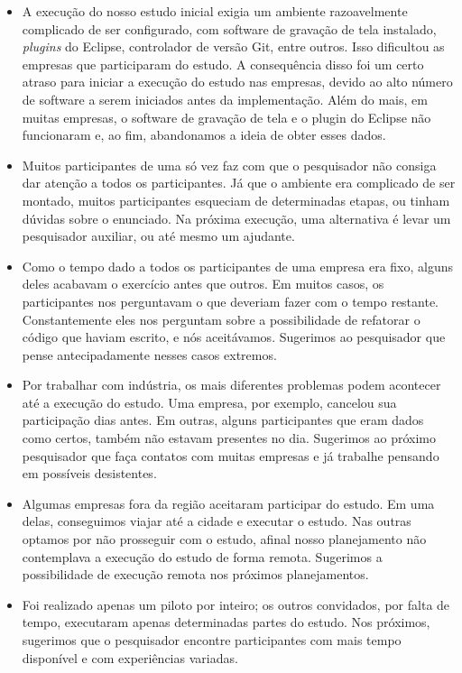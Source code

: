 \begin{itemize}
	
	\item A execução do nosso estudo inicial exigia um ambiente razoavelmente
	complicado de ser configurado, com software de gravação de tela instalado, \textit{plugins} do Eclipse,
	controlador de versão Git, entre outros. Isso dificultou as empresas que participaram
	do estudo. A consequência disso foi um certo atraso para iniciar a execução do estudo nas empresas, 
	devido ao alto número de software a serem iniciados antes da implementação. Além do mais, em muitas empresas,
	o software de gravação de tela e o plugin do Eclipse não funcionaram e, ao fim, abandonamos a ideia de
	obter esses dados.
	
	\item Muitos participantes de uma só vez faz com que o pesquisador não consiga dar atenção
	a todos os participantes. Já que o ambiente era complicado de ser montado, muitos participantes
	esqueciam de determinadas etapas, ou tinham dúvidas sobre o enunciado. Na próxima execução,
	uma alternativa é levar um pesquisador auxiliar, ou até mesmo um ajudante.
	
	\item Como o tempo dado a todos os participantes de uma empresa era fixo, alguns deles
	acabavam o exercício antes que outros. Em muitos casos, os participantes nos perguntavam
	o que deveriam fazer com o tempo restante. Constantemente eles nos perguntam sobre a possibilidade
	de refatorar o código que haviam escrito, e nós aceitávamos. Sugerimos
	ao pesquisador que pense antecipadamente nesses casos extremos.
	
	\item Por trabalhar com indústria, os mais diferentes problemas podem acontecer 
	até a execução do estudo. Uma empresa, por exemplo, cancelou sua participação
	dias antes. Em outras, alguns participantes que eram dados como certos, também
	não estavam presentes no dia. Sugerimos ao próximo pesquisador que faça contatos
	com muitas empresas e já trabalhe pensando em possíveis desistentes.
	
	\item Algumas empresas fora da região aceitaram participar do estudo. Em uma delas,
	conseguimos viajar até a cidade e executar o estudo. Nas outras optamos por não
	prosseguir com o estudo, afinal nosso planejamento não contemplava a execução
	do estudo de forma remota. Sugerimos a possibilidade de execução remota nos 
	próximos planejamentos.
	
	\item Foi realizado apenas um piloto por inteiro; os outros convidados, por falta de tempo, 
	executaram apenas determinadas partes do estudo. Nos próximos, sugerimos
	que o pesquisador encontre participantes com mais tempo disponível e com experiências
	variadas.  
	
\end{itemize}

